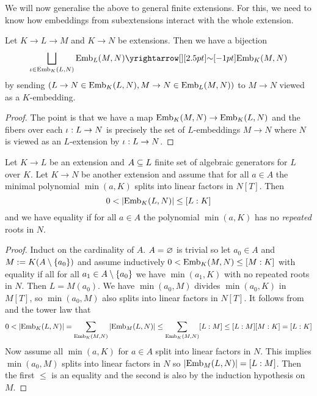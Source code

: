 \documentclass{article}
\begin{document}
We will now generalise the above to general finite extensions.
For this, we need to know how embeddings from subextensions
interact with the whole extension.

\begin{prop}
  
  Let $K \to L \to M$ and $K \to N$ be extensions.
  Then we have a bijection \[
    \bigsqcup_{\io \in \EMB_K(L , N)} \EMB_L(M , N) \map{\sim}{} \EMB_K(M , N)
  \]
  by sending $(L \to N \in \mathrm{Emb}_K(L , N) , M \to N \in \mathrm{Emb}_L(M , N))$
  to $M \to N$ viewed as a $K$-embedding.
\end{prop}
\begin{proof}
  The point is that we have a map $\mathrm{Emb}_K(M , N) \to \mathrm{Emb}_K(L , N)$
  and the fibers over each $\iota : L \to N$ is precisely
  the set of $L$-embeddings $M \to N$ where $N$ is viewed as
  an $L$-extension by $\iota : L \to N$.
\end{proof}

\begin{prop}
  
  Let $K \to L$ be an extension and $A \subseteq L$ finite set of algebraic
  generators for $L$ over $K$.
  Let $K \to N$ be another extension and assume that
  for all $a \in A$ the minimal polynomial $\min(a , K)$ splits
  into linear factors in $N[T]$.
  Then \[
    0 < \left\vert \mathrm{Emb}_K(L , N) \right\vert \leq [L : K]
  \]
  and we have equality if for all $a \in A$ the polynomial $\min(a , K)$
  has no \emph{repeated} roots in $N$. 
\end{prop}
\begin{proof}
  Induct on the cardinality of $A$.
  $A = \varnothing$ is trivial so let $a_0 \in A$ and 
  $M := K(A \setminus \left\{a_0\right\})$ and assume inductively
  $0 < \mathrm{Emb}_K(M , N) \leq [M : K]$ with equality if
  all for all $a_1 \in A\setminus\left\{a_0\right\}$ 
  we have $\min(a_1 , K)$ with no repeated roots
  in $N$.
  Then $L = M(a_0)$.
  We have $\min(a_0, M)$ divides $\min(a_0, K)$ in $M[T]$,
  so $\min(a_0 , M)$ also splits into linear factors in $N[T]$.
  It follows from 
  and the tower law
  that
  \[
    0 < \left\vert \mathrm{Emb}_K(L , N) \right\vert
    = \sum_{\mathrm{Emb}_K(M , N)} \left\vert \mathrm{Emb}_M(L , N) \right\vert
    \leq \sum_{\mathrm{Emb}_K(M , N)} [L : M]
    \leq [L : M] [M : K] = [L : K]
  \]
  Now assume all $\min(a , K)$ for $a \in A$ split into linear factors in $N$.
  This implies $\min(a_0 , M)$ splits into linear factors in $N$
  so $\left\vert \mathrm{Emb}_M(L , N) \right\vert = [L : M]$.
  Then the first $\leq$ is an equality and the second is also
  by the induction hypothesis on $M$.

\end{proof}
\end{document}
